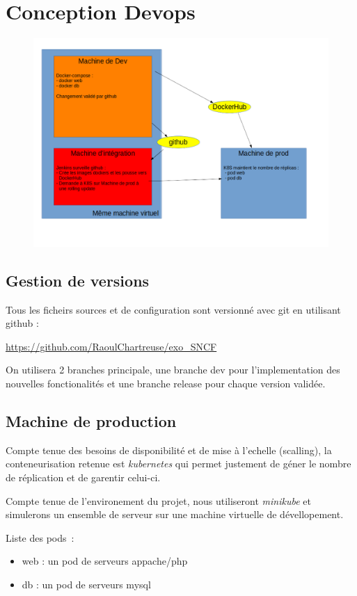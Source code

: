 \section{Conception Devops}
\begin{figure}[h]
   \includegraphics[width=1.0\textwidth]{schema.png}
\end{figure}
\subsection{Gestion de versions}
Tous les ficheirs sources et de configuration sont versionné avec git en utilisant github :

\url{https://github.com/RaoulChartreuse/exo_SNCF}


On utilisera 2 branches principale, une branche dev pour l'implementation des nouvelles fonctionalités et une branche release pour chaque version validée.

\subsection{Machine de production}
Compte tenue des besoins de disponibilité et de mise à l'echelle (scalling), la conteneurisation retenue est \emph{kubernetes} qui permet justement de géner le nombre de réplication et de garentir celui-ci.

Compte tenue de l'environement du projet, nous utiliseront \emph{minikube} et simulerons un ensemble de serveur sur une machine virtuelle de dévellopement.

Liste des pods~:
\begin{itemize}
\item web : un pod de serveurs appache/php
\item db : un pod de serveurs mysql
\end{itemize}

